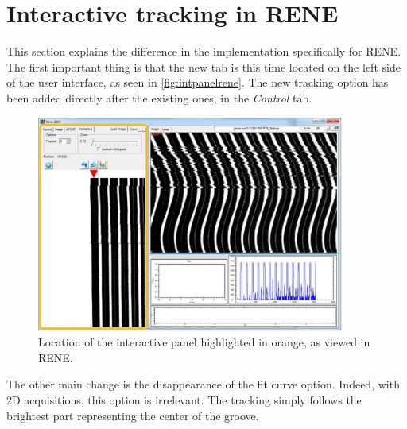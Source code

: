 \section{Interactive tracking in RENE}
\label{sec:inttrackrene}

This section explains the difference in the implementation specifically for RENE. The first important thing is that the new tab is this time located on the left side of the user interface, as seen in \autoref{fig:intpanelrene}. The new tracking option has been added directly after the existing ones, in the \emph{Control} tab.

\begin{figure}[!ht]
\centering
\includegraphics[width=0.9\textwidth]{images/int-right-panel-rene}
\caption[Location of the interactive panel in RENE.]
{Location of the interactive panel highlighted in orange, as viewed in RENE.}
\label{fig:intpanelrene}
\end{figure}

The other main change is the disappearance of the fit curve option. Indeed, with 2D acquisitions, this option is irrelevant. The tracking simply follows the brightest part representing the center of the groove.